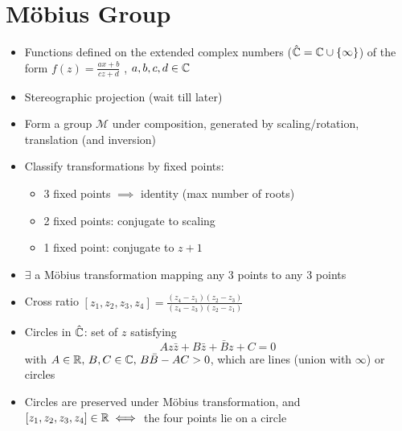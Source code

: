 \section{Möbius Group}
\begin{itemize}
      \item Functions defined on the extended complex numbers ($\hat{\mathbb{C}} = \mathbb{C} \cup \{\infty\}$) of the form $f(z) = \frac{ax+b}{cz+d}$ , $a,b,c,d \in \mathbb{C}$
      \item Stereographic projection (wait till later)
      \item Form a group $\mathcal{M}$ under composition, generated by scaling/rotation, translation (and inversion)
      \item Classify transformations by fixed points:
            \begin{itemize}
                  \item 3 fixed points $\implies $ identity (max number of roots)
                  \item 2 fixed points: conjugate to scaling
                  \item 1 fixed point: conjugate to $z+1$
            \end{itemize}
      \item $\exists$ a Möbius transformation mapping any 3 points to any 3 points
      \item Cross ratio $[z_1, z_2, z_3, z_4] = \frac{(z_4-z_1)(z_2-z_3)}{(z_4-z_3)(z_2-z_1)}$
      \item Circles in $\hat{\mathbb{C}}$: set of $z$ satisfying
            \[ Az\bar{z} + B\bar{z} + \bar{B}z + C = 0 \] with $A \in \mathbb{R}, \, B, C \in \mathbb{C}, \, B\bar{B} - AC > 0$, which are lines (union with $\infty$) or circles
      \item Circles are preserved under Möbius transformation, and $[z_1, z_2, z_3, z_4] \in \mathbb{R} \iff$ the four points lie on a circle
\end{itemize}

